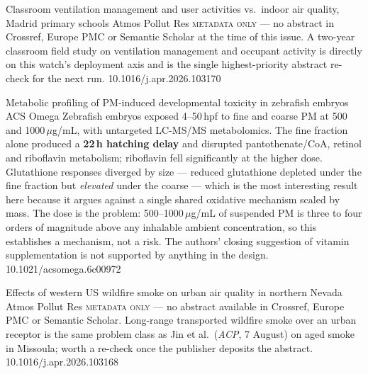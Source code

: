 \documentclass[10pt]{article}
\begin{document}
{Classroom ventilation management and user activities vs.\ indoor air quality, Madrid primary schools}
{Atmos Pollut Res}
{\textsc{metadata only} --- no abstract in Crossref, Europe PMC or Semantic Scholar at
the time of this issue. A two-year classroom field study on ventilation management and
occupant activity is directly on this watch's deployment axis and is the single highest-priority abstract re-check for the next run.}
{10.1016/j.apr.2026.103170}

\clearpage

\enlargethispage{4\baselineskip}

{Metabolic profiling of PM-induced developmental toxicity in zebrafish embryos}
{ACS Omega}
{Zebrafish embryos exposed 4--50\,hpf to fine and coarse PM at 500 and
1000\,$\mu$g/mL, with untargeted LC-MS/MS metabolomics. The fine fraction alone produced
a \textbf{22\,h hatching delay} and disrupted pantothenate/CoA, retinol and riboflavin
metabolism; riboflavin fell significantly at the higher dose. Glutathione responses
diverged by size --- reduced glutathione depleted under the fine fraction but
\emph{elevated} under the coarse --- which is the most interesting result here because it
argues against a single shared oxidative mechanism scaled by mass. The dose is the
problem: 500--1000\,$\mu$g/mL of suspended PM is three to four orders of magnitude above
any inhalable ambient concentration, so this establishes a mechanism, not a risk. The
authors' closing suggestion of vitamin supplementation is not supported by anything in
the design.}
{10.1021/acsomega.6c00972}


{Effects of western US wildfire smoke on urban air quality in northern Nevada}
{Atmos Pollut Res}
{\textsc{metadata only} --- no abstract available in Crossref, Europe PMC or Semantic
Scholar. Long-range transported wildfire smoke over an urban receptor is the same
problem class as Jin et al.\ (\textit{ACP}, 7 August) on aged smoke in Missoula; worth a
re-check once the publisher deposits the abstract.}
{10.1016/j.apr.2026.103168}
\end{document}
